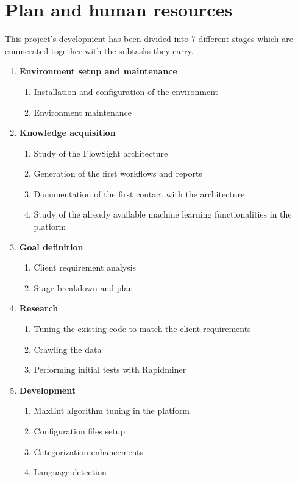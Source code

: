 \section{Plan and human resources}
This project's development has been divided into 7 different stages which are enumerated together with the subtasks they carry.
\begin{enumerate}
  \item \textbf{Environment setup and maintenance}
  \begin{enumerate}
    \item Installation and configuration of the environment
    \item Environment maintenance
  \end{enumerate}
  \item \textbf{Knowledge acquisition}
  \begin{enumerate}
    \item Study of the FlowSight architecture
    \item Generation of the first workflows and reports
    \item Documentation of the first contact with the architecture
    \item Study of the already available machine learning functionalities in the platform
  \end{enumerate}
  \item \textbf{Goal definition}
  \begin{enumerate}
    \item Client requirement analysis   
    \item Stage breakdown and plan
  \end{enumerate}
  \item \textbf{Research}
  \begin{enumerate}
    \item Tuning the existing code to match the client requirements
    \item Crawling the data
    \item Performing initial tests with Rapidminer
  \end{enumerate}
  \item \textbf{Development}
  \begin{enumerate}
    \item MaxEnt algorithm tuning in the platform
    \item Configuration files setup
    \item Categorization enhancements
    \item Language detection

\end{enumerate}
\end{enumerate}
